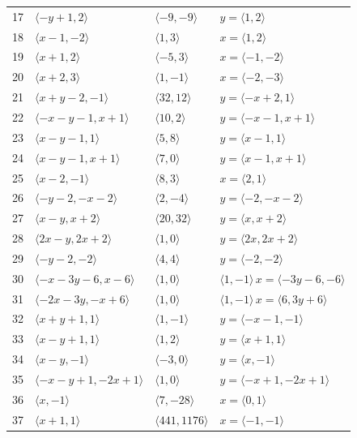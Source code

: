\documentclass[11pt]{article}
\begin{document}
\begin{longtable}{@{}rlll@{}}
17 & $\langle -y+1,2\rangle$ & $\langle -9,-9\rangle$ & $y=\langle 1,2\rangle$\\
18 & $\langle x-1,-2\rangle$ & $\langle 1,3\rangle$ & $x=\langle 1,2\rangle$\\
19 & $\langle x+1,2\rangle$ & $\langle -5,3\rangle$ & $x=\langle -1,-2\rangle$\\
20 & $\langle x+2,3\rangle$ & $\langle 1,-1\rangle$ & $x=\langle -2,-3\rangle$\\
21 & $\langle x+y-2,-1\rangle$ & $\langle 32,12\rangle$ & $y=\langle -x+2,1\rangle$\\
22 & $\langle -x-y-1,x+1\rangle$ & $\langle 10,2\rangle$ & $y=\langle -x-1,x+1\rangle$\\
23 & $\langle x-y-1,1\rangle$ & $\langle 5,8\rangle$ & $y=\langle x-1,1\rangle$\\
24 & $\langle x-y-1,x+1\rangle$ & $\langle 7,0\rangle$ & $y=\langle x-1,x+1\rangle$\\
25 & $\langle x-2,-1\rangle$ & $\langle 8,3\rangle$ & $x=\langle 2,1\rangle$\\
26 & $\langle -y-2,-x-2\rangle$ & $\langle 2,-4\rangle$ & $y=\langle -2,-x-2\rangle$\\
27 & $\langle x-y,x+2\rangle$ & $\langle 20,32\rangle$ & $y=\langle x,x+2\rangle$\\
28 & $\langle 2x-y,2x+2\rangle$ & $\langle 1,0\rangle$ & $y=\langle 2x,2x+2\rangle$\\
29 & $\langle -y-2,-2\rangle$ & $\langle 4,4\rangle$ & $y=\langle -2,-2\rangle$\\
30 & $\langle -x-3y-6,x-6\rangle$ & $\langle 1,0\rangle$ & $\langle 1,-1\rangle\,x=\langle -3y-6,-6\rangle$\\
31 & $\langle -2x-3y,-x+6\rangle$ & $\langle 1,0\rangle$ & $\langle 1,-1\rangle\,x=\langle 6,3y+6\rangle$\\
32 & $\langle x+y+1,1\rangle$ & $\langle 1,-1\rangle$ & $y=\langle -x-1,-1\rangle$\\
33 & $\langle x-y+1,1\rangle$ & $\langle 1,2\rangle$ & $y=\langle x+1,1\rangle$\\
34 & $\langle x-y,-1\rangle$ & $\langle -3,0\rangle$ & $y=\langle x,-1\rangle$\\
35 & $\langle -x-y+1,-2x+1\rangle$ & $\langle 1,0\rangle$ & $y=\langle -x+1,-2x+1\rangle$\\
36 & $\langle x,-1\rangle$ & $\langle 7,-28\rangle$ & $x=\langle 0,1\rangle$\\
37 & $\langle x+1,1\rangle$ & $\langle 441,1176\rangle$ & $x=\langle -1,-1\rangle$\\

\end{longtable}
\end{document}
